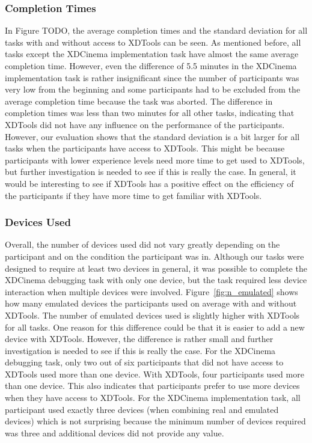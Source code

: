 \subsubsection{Completion Times}

In Figure TODO, the average completion times and the standard deviation for all tasks with and without access to XDTools can be seen. As mentioned before, all tasks except the XDCinema implementation task have almost the same average completion time. However, even the difference of 5.5 minutes in the XDCinema implementation task is rather insignificant since the number of participants was very low from the beginning and some participants had to be excluded from the average completion time because the task was aborted. The difference in completion times was less than two minutes for all other tasks, indicating that XDTools did not have any influence on the performance of the participants. However, our evaluation shows that the standard deviation is a bit larger for all tasks when the participants have access to XDTools. This might be because participants with lower experience levels need more time to get used to XDTools, but further investigation is needed to see if this is really the case. In general, it would be interesting to see if XDTools has a positive effect on the efficiency of the participants if they have more time to get familiar with XDTools.

\subsubsection{Devices Used}

Overall, the number of devices used did not vary greatly depending on the participant and on the condition the participant was in. Although our tasks were designed to require at least two devices in general, it was possible to complete the XDCinema debugging task with only one device, but the task required less device interaction when multiple devices were involved. Figure~\ref{fig:n_emulated} shows how many emulated devices the participants used on average with and without XDTools. The number of emulated devices used is slightly higher with XDTools for all tasks. One reason for this difference could be that it is easier to add a new device with XDTools. However, the difference is rather small and further investigation is needed to see if this is really the case. For the XDCinema debugging task, only two out of six participants that did not have access to XDTools used more than one device. With XDTools, four participants used more than one device. This also indicates that participants prefer to use more devices when they have access to XDTools. For the XDCinema implementation task, all participant used exactly three devices (when combining real and emulated devices) which is not surprising because the minimum number of devices required was three and additional devices did not provide any value. 

